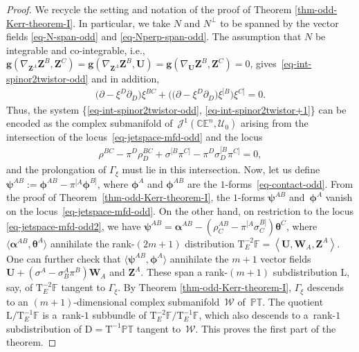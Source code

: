 \documentclass[pdftex]{sigma}
\numberwithin{equation}{section}
\newcommand{\mc} [1]{\mathcal{#1}}
\newcommand{\Drm} {{\mathrm{D}}}
\newcommand{\Tgt} {\mathrm{T}}
\newcommand{\PT} {\mathbb{PT}}
\newcommand{\E} {\mathbb{E}}
\newcommand{\C} {\mathbb{C}}
\newcommand{\F} {\mathbb{F}}
\begin{document}
\begin{proof}We recycle the setting and notation of the proof of Theorem \ref{thm-odd-Kerr-theorem-I}. In particular, we take $N$ and $N^\perp$ to be spanned by the vector f\/ields \eqref{eq-N-span-odd} and \eqref{eq-Nperp-span-odd}. The assumption that $N$ be integrable and co-integrable, i.e., $\bm{g} ( \nabla_{\bm{Z}^{A}} \bm{Z}^{B} , \bm{Z}^{C} ) = \bm{g} ( \nabla_{\bm{Z}^{A}} \bm{Z}^{B} , \bm{U} ) = \bm{g} ( \nabla_{\bm{U}} \bm{Z}^{B} , \bm{Z}^{C} ) =0$, gives~\eqref{eq-int-spinor2twistor-odd} and in addition,
\begin{gather}\label{eq-int-spinor2twistor+1}
\big( \partial - \xi^{D} \partial _{D} \big) \xi^{BC} + \big( \big( \partial - \xi^{D} \partial _{D} \big) \xi^{[B} \big) \xi^{C]} = 0 .
\end{gather}
Thus, the system \{\eqref{eq-int-spinor2twistor-odd}, \eqref{eq-int-spinor2twistor+1}\} can be encoded as the complex submanifold of~$\mc{J}^1(\C \E^n, \mc{U}_0)$ arising from the intersection of the locus~\eqref{eq-jetspace-mfd-odd} and the locus
\begin{gather}\label{eq-jetspace-mfd-odd2}
\rho^{BC} - \pi^{D} \rho_{D}^{BC} + \sigma^{[B} \pi^{C]} - \pi^{D} \sigma_{D}^{[B} \pi^{C]} = 0 ,
\end{gather}
and the prolongation of $\Gamma_\xi$ must lie in this intersection. Now, let us def\/ine $\bm{\psi}^{AB} := \bm{\phi}^{AB} - \pi^{[A} \bm{\phi}^{B]}$, where $\bm{\phi}^A$ and $\bm{\phi}^{AB}$ are the $1$-forms~\eqref{eq-contact-odd}. From the proof of Theorem~\ref{thm-odd-Kerr-theorem-I}, the $1$-forms $\bm{\psi}^{AB}$ and~$\bm{\phi}^A$ vanish on the locus~\eqref{eq-jetspace-mfd-odd}. On the other hand, on restriction to the locus \eqref{eq-jetspace-mfd-odd2}, we have $\bm{\psi}^{AB} = \bm{\alpha}^{AB} - \left( \rho_{C}^{AB} - \pi^{[A} \sigma_{C}^{B]} \right) \bm{\theta}^C$, where $\langle \bm{\alpha}^{AB}, \bm{\theta}^A \rangle$ annihilate the rank-$(2m+1)$ distribution $\Tgt^{-2}_E \F = \left\langle \bm{U} , \bm{W}_A , \bm{Z}^A \right\rangle$. One can further check that $\langle \bm{\psi}^{AB} , \bm{\phi}^A \rangle$ annihilate the $m+1$ vector f\/ields $\bm{U} + \left( \sigma^A - \sigma_B^A \pi^B \right) \bm{W}_A$ and $\bm{Z}^A$. These span a rank-$(m+1)$ subdistribution $\mathrm{L}$, say, of $\Tgt^{-2}_E \F$ tangent to $\Gamma_\xi$. By Theorem \ref{thm-odd-Kerr-theorem-I}, $\Gamma_\xi$ descends to an $(m+1)$-dimensional complex submanifold~$\mc{W}$ of~$\PT$. The quotient $\mathrm{L}/\Tgt^{-1}_E \F$ is a~rank-$1$ subbundle of $\Tgt^{-2}_E \F/\Tgt^{-1}_E \F$, which also descends to a~rank-$1$ subdistribution of $\Drm = \Tgt^{-1} \PT$ tangent to~$\mc{W}$. This proves the f\/irst part of the theorem.


\end{proof}
\end{document}
